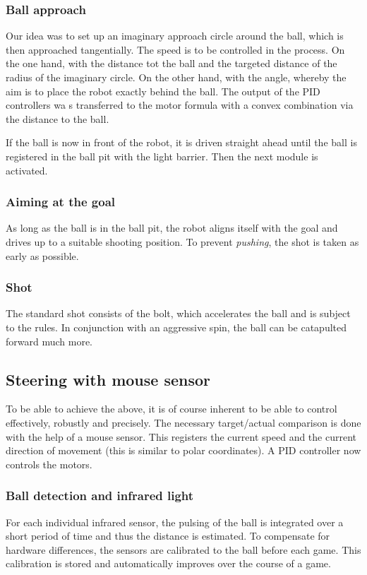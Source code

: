 \subsubsection{Ball approach}
Our idea was to set up an imaginary approach circle around the ball, which is then approached tangentially. The speed is to be controlled in the process.
On the one hand, with the distance tot the ball and the targeted distance of the radius of the imaginary circle.
On the other hand, with the angle, whereby the aim is to place the robot exactly behind the ball. 
The output of the PID controllers wa s transferred to the motor formula with a convex combination via the distance to the ball.

If the ball is now in front of the robot, it is driven straight ahead until the ball is registered in the ball pit with the light barrier. Then the next module is activated.

\subsubsection{Aiming at the goal}
As long as the ball is in the ball pit, the robot aligns itself with the goal and drives up to a suitable shooting position. To prevent \textit{pushing}, the shot is taken as early as possible.

\subsubsection{Shot}
The standard shot consists of the bolt, which accelerates the ball and is subject to the rules. In conjunction with an aggressive spin, the ball can be catapulted forward much more.

\subsection{Steering with mouse sensor}
To be able to achieve the above, it is of course inherent to be able to control effectively, robustly and precisely.
The necessary target/actual comparison is done with the help of a mouse sensor.
This registers the current speed and the current direction of movement (this is similar to polar coordinates). A PID controller now controls the motors.

\subsubsection{Ball detection and infrared light}
For each individual infrared sensor, the pulsing of the ball is integrated over a short period of time and thus the distance is estimated.
To compensate for hardware differences, the sensors are calibrated to the ball before each game. This calibration is stored and automatically improves over the course of a game. 


